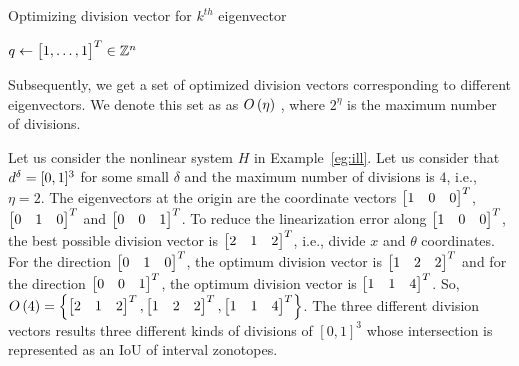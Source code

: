 \begin{algorithm}
\caption{Optimizing division vector for $k^{th}$
eigenvector} $q\gets \begin{bmatrix}1,\ldots,1\end{bmatrix}^T\in\mathbb{Z}^n$\;
\end{algorithm}
%
Subsequently, we get a set of optimized division vectors corresponding
to different eigenvectors.  We denote this set as as $O\left(\eta\right)$ ,
where $2^\eta$ is the maximum number of divisions.
%
\begin{example}
Let us consider the nonlinear system $H$ in Example~\ref{eg:ill}.  Let
us consider that $d^\delta = [0,1]^3$ for some small $\delta$
and the maximum number of divisions is $4$, i.e., $\eta = 2$.  The
eigenvectors at the origin are the coordinate vectors $\begin{bmatrix}1 & 0
& 0\end{bmatrix}^T$, $\begin{bmatrix}0 & 1 & 0\end{bmatrix}^T$ and $\begin{bmatrix}0 & 0 & 1\end{bmatrix}^T$.  To
reduce the linearization error along $\begin{bmatrix}1 & 0 & 0\end{bmatrix}^T$, the
best possible division vector is $\begin{bmatrix}2 & 1 & 2\end{bmatrix}^T$, i.e.,
divide $x$ and $\theta$ coordinates.  For the direction $\begin{bmatrix}0 &
1 &0\end{bmatrix}^T$, the optimum division vector is $\begin{bmatrix}1 & 2 & 2\end{bmatrix}^T$ and
for the direction $\begin{bmatrix}0 & 0 & 1\end{bmatrix}^T$, the optimum division
vector is $\begin{bmatrix}1 & 1 & 4\end{bmatrix}^T$.  So, $O\left(4\right) = \left\{\begin{bmatrix}2
& 1 & 2\end{bmatrix}^T, \begin{bmatrix}1 & 2 & 2\end{bmatrix}^T, \begin{bmatrix}1 & 1 & 4\end{bmatrix}^T\right\}$.  The
three different division vectors results three different kinds of
divisions of $[0,1]^3$ whose intersection is represented as an IoU of
interval zonotopes.
\end{example}
%

